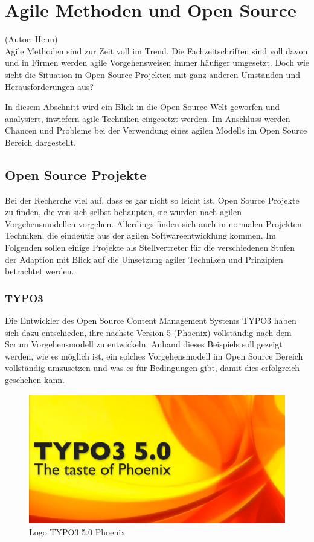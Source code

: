 \section{Agile Methoden und Open Source}
(Autor: Henn)\\

Agile Methoden sind zur Zeit voll im Trend. Die Fachzeitschriften sind voll davon und in Firmen
werden agile Vorgehensweisen immer häufiger umgesetzt. Doch wie sieht die Situation in Open Source
Projekten mit ganz anderen Umständen und Herausforderungen aus?

In diesem Abschnitt wird ein Blick in die Open Source Welt geworfen und
analysiert, inwiefern agile Techniken eingesetzt werden. Im Anschluss werden
Chancen und Probleme bei der Verwendung eines agilen Modells im Open Source
Bereich dargestellt.


\subsection{Open Source Projekte}
Bei der Recherche viel auf, dass es gar nicht so leicht ist, Open Source
Projekte zu finden, die von sich selbst behaupten, sie würden nach agilen
Vorgehensmodellen vorgehen. Allerdings finden sich auch in normalen Projekten
Techniken, die eindeutig aus der agilen Softwareentwicklung kommen. Im Folgenden
sollen einige Projekte als Stellvertreter für die verschiedenen Stufen der
Adaption mit Blick auf die Umsetzung agiler Techniken und Prinzipien betrachtet werden.

\subsubsection{TYPO3}
Die Entwickler des Open Source Content Management Systems TYPO3 haben sich dazu
entschieden, ihre nächste Version 5 (Phoenix) vollständig nach dem Scrum Vorgehensmodell zu
entwickeln. Anhand dieses Beispiels soll gezeigt werden, wie es möglich ist,
ein solches Vorgehensmodell im Open Source Bereich vollständig umzusetzen und
was es für Bedingungen gibt, damit dies erfolgreich geschehen kann.
\begin{figure}[h]
	\centering
	\includegraphics[width=1\textwidth]{images/typo3_Phoenix_logo.jpg}
	\caption{Logo TYPO3 5.0 Phoenix}
	\label{Logo-Phoenix}
\end{figure}

